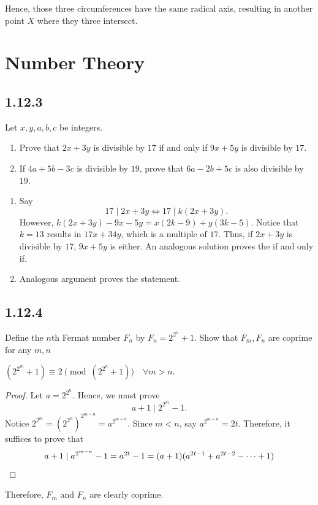 \documentclass[12pt]{article}
\begin{document}
Hence, those three circumferences have the same radical axis, resulting in another point $X$ where they three intersect.

\clearpage

\section{Number Theory}
\subsection{1.12.3}
\begin{problem}
Let $x,y,a,b,c$ be integers.
\begin{enumerate}
	\item Prove that $2x+3y$ is divisible by $17$ if and only if $9x+5y$ is divisible by $17$.
	\item If $4a+5b-3c$ is divisible by $19$, prove that $6a-2b+5c$ is also divisible by $19$.
\end{enumerate}
\end{problem}
\begin{enumerate}
	\item Say
	      \[
		      17 \mid 2x+3y \iff 17 \mid k(2x+3y).
	      \]
	      However, $k(2x+3y)-9x-5y=x(2k-9)+y(3k-5)$. Notice that $k=13$ results in $17x+34y$, which is
	      a multiple of $17$. Thus, if $2x+3y$ is divisible by $17$, $9x+5y$ is either. An analogous
	      solution proves the if and only if.
	\item Analogous argument proves the statement.
\end{enumerate}

\clearpage

\subsection{1.12.4}
\begin{problem}
Define the $n$th Fermat number $F_n$ by $F_n=2^{2^n}+1$. Show that $F_m,F_n$ are coprime for any $m,n$
\end{problem}
\begin{claim}
	$(2^{2^{m}}+1) \equiv 2 \pmod{(2^{2^{n}}+1)} \quad \forall m>n$.
\end{claim}
\begin{proof}
	Let $a=2^{2^{n}}$. Hence, we must prove
	\[
		a+1 \mid 2^{2^{m}}-1.
	\]
	Notice $2^{2^{m}}=(2^{2^{n}})^{2^{m-n}}=a^{2^{m-n}}$. Since $m<n$, say $a^{2^{m-n}}=2t$. Therefore, it suffices to prove that
	\[
		a+1 \mid a^{2^{m-n}}-1 = a^{2t}-1=(a+1)(a^{2t-1}+a^{2t-2}-\dots+1) \qedhere
	\]
\end{proof}
Therefore, $F_m$ and $F_n$ are clearly coprime.
\end{document}

